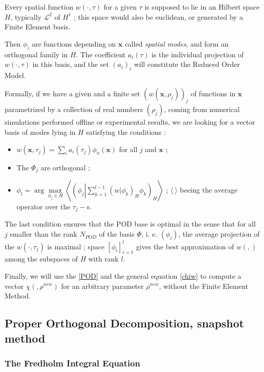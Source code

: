 \ligneinter
Every spatial function $w(\cdot,\tau)$ for a given $\tau$ is supposed to lie in an Hilbert space $H$, %
typically $\mathcal{L}^2$ of $H^1$ ; this space would also be euclidean, or generated by a Finite Element basis.

\par
Then $\phi_i$ are functions depending on $\mathbf{x}$ called \emph{spatial modes}, and form an orthogonal family in $H$. %
The coefficient $a_i(\tau)$ is the individual projection of $w(\cdot,\tau)$ in this basis, %
and the set $(a_i)_i$ will constitute the Reduced Order Model.

\ligneinter
Formally, if we have a given and a finite set $(w(\mathbf{x},\rho_j))_j$ of functions in $\mathbf{x}$ parametrized by a collection of real numbers $(\rho_j)$, %
coming from numerical simulations performed \og{} offline \fg{} or experimental results, we are looking for a vector basis of modes lying in %
$H$ %
satisfying the conditions :

\begin{itemize}
\item $w(\mathbf{x},\tau_j)=\sum\limits_i a_i(\tau_j)\phi_n(\mathbf{x})$ for all $j$ and $\mathbf{x}$ ;
\item The $\Phi_j$ are orthogonal ;
\item $\phi_l= \arg\max\limits_{\phi_j\in H}\left\langle\left(\phi_j\left|\sum\limits_{k=1}^{l-1}\left(w|\phi_k\right)_H\phi_k\right.\right)_H\right\rangle$ ; %
$\langle \ \rangle$ beeing the average operator over the $\tau_j-$s.
\end{itemize}

The last condition ensures that the POD base is optimal in the sense that for all $j$ smaller than the rank $N_{POD}$ of the basis $\Phi$, i. e. $(\phi_i)$, %
the average projection of the $w(\cdot , \tau_j)$ is maximal ; %
space $[\phi_i]_{i=1}^{l}$ gives the best approximation of $w(,)$ among the subspaces of $H$ with rank $l$.

\etoile
Finally, we will use the \ref{POD} and the general equation \ref{chiw} to compute a vector $\chi(,\rho^{new})$ for an arbitrary parameter $\rho^{new}$, %
without the Finite Element Method.

\subsection{Proper Orthogonal Decomposition, snapshot method}

\subsubsection{The Fredholm Integral Equation}

